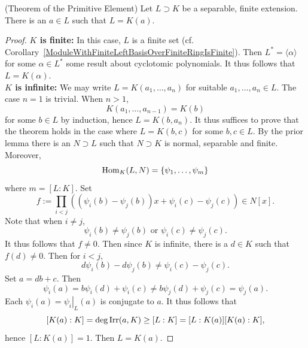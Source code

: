     \begin{theorem}(Theorem of the Primitive Element)
        Let $L\supset K$ be a separable, finite extension. There is an $a\in L$ such that $L = K(a)$. 
    \end{theorem}
    \begin{proof}
        \textbf{$K$ is finite:} In this case, $L$ is a finite set (cf. Corollary~\ref{ModuleWithFiniteLeftBasisOverFiniteRingIsFinite}). Then $L^\ast = \langle \alpha\rangle$ for some $\alpha\in L^\ast$ {\Large some result about cyclotomic polynomials}. It thus follows that $L = K(\alpha)$.\\
        \textbf{$K$ is infinite:} We may write $L=K(a_1,\dots,a_n)$ for suitable $a_1,\dots,a_n\in L$. The case $n=1$ is trivial. When $n>1$, 
        $$
            K(a_1,\dots,a_{n-1}) = K(b)
        $$
        for some $b\in L$ by induction, hence $L = K(b,a_n)$. It thus suffices to prove that the theorem holds in the case where $L= K(b,c)$ for some $b,c\in L$. By the prior lemma there is an $N\supset L$ such that $N\supset K$ is normal, separable and finite. Moreover, 
        $$
            \mathrm{Hom}_K(L,N) = \{\psi_1,\dots,\psi_m\}
        $$ 
        where $m = [L:K]$. Set 
        $$
            f := \prod_{i<j} \left((\psi_i(b)-\psi_j(b))x+\psi_i(c)-\psi_j(c)\right)\in N[x].
        $$
        Note that when $i\neq j$, 
        $$
            \psi_i(b)\neq \psi_j(b) \text{ or } \psi_i(c) \neq \psi_j(c).
        $$
        It thus follows that $f\neq 0$. Then since $K$ is infinite, there is a $d\in K$ such that $f(d)\neq 0$. Then for $i<j$, 
        $$
            d\psi_i(b)-d\psi_j(b) \neq \psi_i(c) - \psi_j(c).
        $$ 
        Set $a = db+c$. Then 
        $$
            \psi_i(a) = b \psi_i(d)+\psi_i(c) \neq b\psi_j(d)+\psi_j(c) = \psi_j(a).
        $$
        Each $\psi_i(a) = \left.\psi_i\right|_{L}(a)$ is conjugate to $a$. It thus follows that 
        $$
            [K(a) : K] = \deg \mathrm{Irr}(a,K) \geq [L : K] = [L : K(a)][K(a) : K], 
        $$
        hence $[L : K(a)] = 1$. Then $ L = K(a)$. 
    \end{proof}
